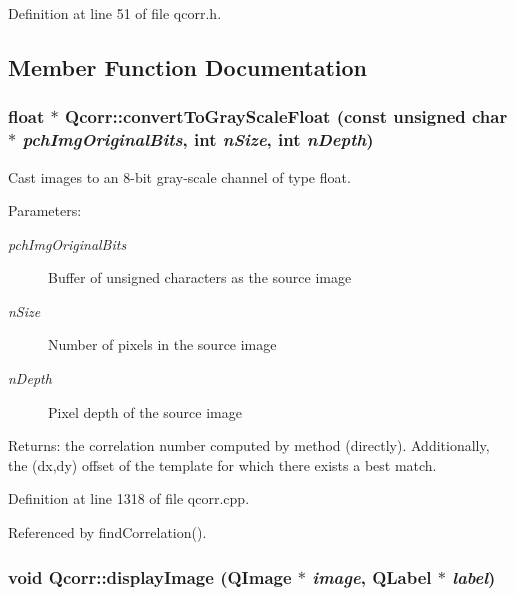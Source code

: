 Definition at line 51 of file qcorr.h.

\subsection{Member Function Documentation}
\hypertarget{classQcorr_d1b26ace597c0c4a0f64a0bd9576d4fc}{
\subsubsection[{convertToGrayScaleFloat}]{\setlength{\rightskip}{0pt plus 5cm}float $\ast$ Qcorr::convertToGrayScaleFloat (const unsigned char $\ast$ {\em pchImgOriginalBits}, \/  int {\em nSize}, \/  int {\em nDepth})}}
\label{classQcorr_d1b26ace597c0c4a0f64a0bd9576d4fc}


Cast images to an 8-bit gray-scale channel of type float. 

\begin{Desc}
\item[Parameters:]
\begin{description}
\item[{\em pchImgOriginalBits}]Buffer of unsigned characters as the source image \item[{\em nSize}]Number of pixels in the source image \item[{\em nDepth}]Pixel depth of the source image \end{description}
\end{Desc}
\begin{Desc}
\item[Returns:]the correlation number computed by method (directly). Additionally, the (dx,dy) offset of the template for which there exists a best match. \end{Desc}


Definition at line 1318 of file qcorr.cpp.

Referenced by findCorrelation().\hypertarget{classQcorr_925b0715143a0afa981851547f8b9256}{
\subsubsection[{displayImage}]{\setlength{\rightskip}{0pt plus 5cm}void Qcorr::displayImage (QImage $\ast$ {\em image}, \/  QLabel $\ast$ {\em label})}}
\label{classQcorr_925b0715143a0afa981851547f8b9256}


